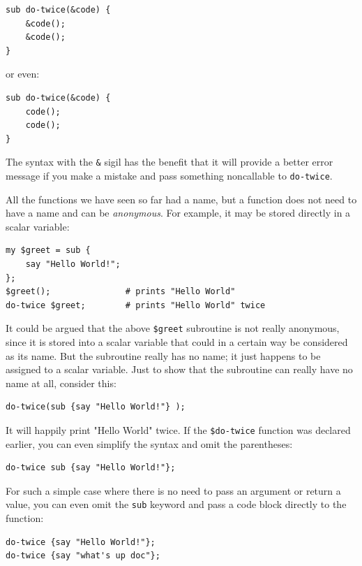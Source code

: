 \begin{verbatim}
sub do-twice(&code) {
    &code(); 
    &code();
}
\end{verbatim}

or even:
\begin{verbatim}
sub do-twice(&code) {
    code(); 
    code();
}
\end{verbatim}

The syntax with the \verb"&" sigil has the benefit that 
it will provide a better error message if you make a mistake 
and pass something noncallable to \verb"do-twice". 

All the functions we have seen so far had a name, but a 
function does not need to have a name and can be \emph{anonymous}. 
For example, it may be stored directly in a scalar variable:

\begin{verbatim}
my $greet = sub {
    say "Hello World!";
};
$greet();               # prints "Hello World"
do-twice $greet;        # prints "Hello World" twice
\end{verbatim}

It could be argued that the above \verb"$greet" subroutine  
is not really anonymous, since it is stored into a scalar 
variable that could in a certain way be considered as its name. 
But the subroutine really has no name; it just happens to be 
assigned to a scalar variable. Just to show that the subroutine 
can really have no name at all, consider this:

\begin{verbatim}
do-twice(sub {say "Hello World!"} );
\end{verbatim}

It will happily print "Hello World" twice. If the \verb"$do-twice"
function was declared earlier, you can even simplify the syntax 
and omit the parentheses:

\begin{verbatim}
do-twice sub {say "Hello World!"};
\end{verbatim}

For such a simple case where there is no need to pass an 
argument or return a value, you can even omit the 
\verb"sub" keyword and pass a code block directly to the function:

\begin{verbatim}
do-twice {say "Hello World!"};
do-twice {say "what's up doc"};
\end{verbatim}


